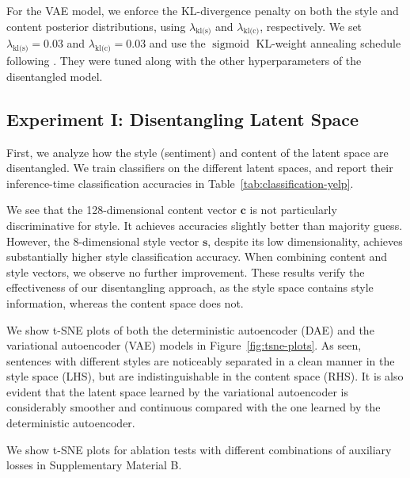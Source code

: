 \documentclass[letterpaper]{article} %
\newcommand{\hyp}[1]{\lambda_{\text{#1}}}
\newcommand{\citeay}[1]{\citeauthor{#1} \shortcite{#1}}
\begin{document}
For the VAE model, we enforce the KL-divergence penalty on both the style and content posterior distributions, using $\hyp{kl(s)}$ and $\hyp{kl(c)}$, respectively.
We set $\hyp{kl(s)} = 0.03$ and $\hyp{kl(c)} = 0.03$ and use the $\operatorname{sigmoid}$ KL-weight annealing schedule following \citeay{bahuleyan2018probabilistic}. They were tuned along with the other hyperparameters of the disentangled model.


\subsection{Experiment I: Disentangling Latent Space}

First, we analyze how the style (sentiment) and content of the latent space are disentangled.
We train classifiers on the different latent spaces, and report their inference-time classification accuracies in Table~\ref{tab:classification-yelp}.

We see that the 128-dimensional content vector $\bm c$ is not particularly discriminative for style.
It achieves accuracies slightly better than majority guess.
However, the 8-dimensional style vector $\bm s$, despite its low dimensionality, achieves substantially higher style classification accuracy.
When combining content and style vectors, we observe no further improvement.
These results verify the effectiveness of our disentangling approach, as the style space contains style information, whereas the content space does not.

We show t-SNE plots of both the deterministic autoencoder (DAE) and the variational autoencoder (VAE) models in Figure~\ref{fig:tsne-plots}.
As seen, sentences with different styles are noticeably separated in a clean manner in the style space (LHS), but are indistinguishable in the content space (RHS).
It is also evident that the latent space learned by the variational autoencoder is considerably smoother and continuous compared with the one learned by the deterministic autoencoder.

We show t-SNE plots for ablation tests with different combinations of auxiliary losses in Supplementary Material B.
\end{document}
